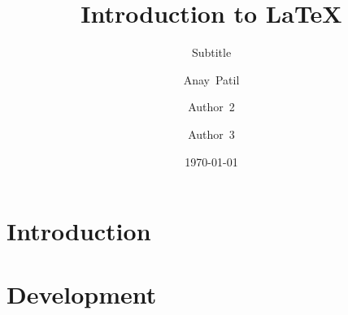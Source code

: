 \documentclass{beamer}
\begin{document}
    \begin{frame}
        \title{Introduction to \LaTeX{}}
        \author{Anay~Patil \and 
        Author~2 \and
        Author~3}
        \date{\today}
        \subtitle{Subtitle}
        \maketitle
    \end{frame}
    \section{Introduction}
    \section{Development}
\end{document}
